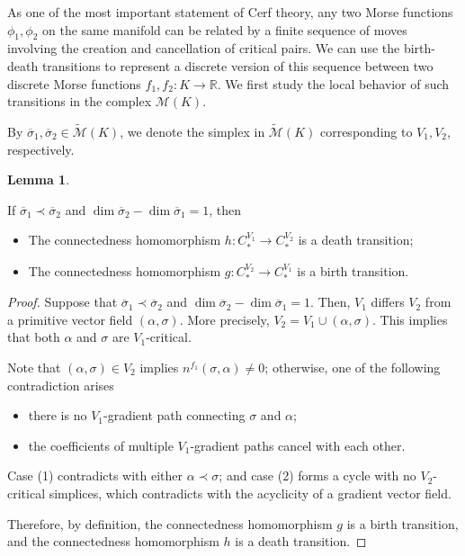 \documentclass[a4paper,12pt,notitlepage]{amsart}
\theoremstyle{definition}%
\newtheorem{lemma}[theorem]{Lemma}
\theoremstyle{definition}%
\theoremstyle{definition}%
\newcommand{\MMK}{\widetilde{\mathcal{M}} (K)}
\begin{document}
As one of the most important 
statement of Cerf theory,
any two Morse functions $\phi_1, \phi_2$ 
on the same manifold can be related by a 
finite sequence of moves involving the creation and cancellation of critical pairs.
We  can use 
the birth-death transitions
to represent a discrete version of 
this sequence between two discrete Morse functions $f_1, f_2:K \to \mathbb{R}$.
We first study the local behavior of such transitions in the complex $\mathcal{M}(K)$.


By $\overline{\sigma}_1, \overline{\sigma}_2 \in \widetilde{\mathcal{M}} (K) $,
we denote the simplex in $\MMK$
corresponding to $V_1,  V_2$,
respectively.


\begin{lemma}

\label{482}

If $\overline{\sigma}_1 \prec \overline{\sigma}_2$ 
and $\dim \overline{\sigma}_2- \dim \overline{\sigma}_1=1$,
then 
\begin{itemize}
 \item The connectedness homomorphism $h: C^{V_1}_\ast \to C^{V_2}_\ast$ is a death transition; 
 \item The connectedness  homomorphism $g: C^{V_2}_\ast \to C^{V_1}_\ast$ is a birth transition.
\end{itemize}



\end{lemma}

\begin{proof}
Suppose that 
$\overline{\sigma}_1 \prec \overline{\sigma}_2$ 
and $\dim \overline{\sigma}_2- \dim \overline{\sigma}_1=1$.
Then,
$V_1$ differs $V_2$   from a primitive vector field $(\alpha, \sigma)$.
More precisely,
$V_2=V_1\cup (\alpha, \sigma).$
This implies that
both 
$\alpha$ and $ \sigma$
are $V_1$-critical.

Note that  $(\alpha, \sigma)\in V_2$ implies
 $n^{f_1}(\sigma, \alpha)\neq 0$;
 otherwise,
one of the following contradiction arises
\begin{itemize}
\item there is no $V_1$-gradient path connecting $\sigma$ and $\alpha$; 
\item the coefficients of multiple  $V_1$-gradient  paths cancel with each other.
\end{itemize}
Case (1) contradicts with  either $\alpha\prec \sigma$;
and 
case (2)  forms a cycle with no $V_2$-critical simplices, which contradicts with the 
acyclicity 
of a gradient vector field.

Therefore, 
by definition,
the connectedness homomorphism $g$ is a birth transition,
and the connectedness homomorphism  $h$ is a death transition.
\end{proof}
\end{document}
